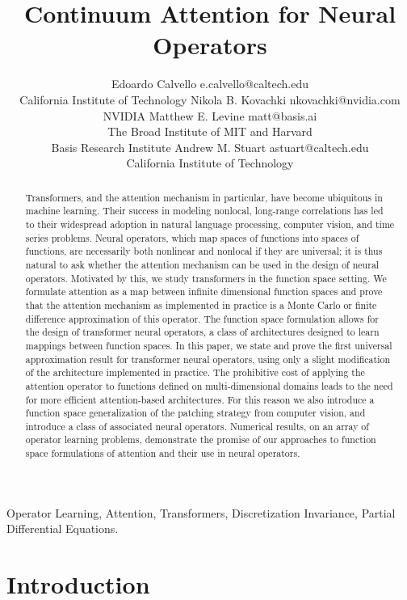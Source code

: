 \documentclass[twoside]{article}
\title{Continuum Attention for Neural Operators}
\author{\name Edoardo Calvello \email e.calvello@caltech.edu \\
       \addr 
       California Institute of Technology
       \AND
       \name Nikola B. Kovachki \email nkovachki@nvidia.com \\
       \addr NVIDIA
       \AND
       \name Matthew E. Levine \email matt@basis.ai \\
       \addr The Broad Institute of MIT and Harvard \\
       \addr Basis Research Institute
       \AND
       \name Andrew M. Stuart \email astuart@caltech.edu \\
       \addr
       California Institute of Technology}
\newcommand{\1}{\mathbbm{1}}
\newcommand{\nk}[1]{{\color{darkgreen}{#1}}}
\newcommand{\as}[1]{{\color{darkred}{#1}}}
\newcommand{\ec}[1]{{\color{blue}{#1}}}
\newcommand{\ml}[1]{{\color{cyan}{#1}}}
\begin{document}

\maketitle

\begin{abstract}
    Transformers, and the attention mechanism in particular, have become ubiquitous in machine learning. Their success in modeling nonlocal, long-range correlations has led to their widespread adoption in natural language processing, computer vision, and time series problems. Neural operators, which map spaces of functions into spaces of functions, are necessarily both nonlinear and nonlocal if they are universal;
    it is thus natural to ask whether the attention mechanism can be used in the design of neural operators. Motivated by this, we study transformers in the function space setting. We formulate attention as a map between infinite dimensional function spaces and prove that the attention mechanism as implemented in practice is a Monte Carlo
    or finite difference approximation of this operator. The function space formulation allows for the design of transformer neural operators, a class of architectures designed to learn mappings between function spaces. In this paper, we state and prove the first universal approximation result for transformer neural operators, using only a slight modification of the architecture implemented in practice. The prohibitive cost of applying the attention operator to functions defined on multi-dimensional domains leads to the need for more efficient attention-based architectures. For this reason we also introduce a function space generalization of the patching strategy from computer vision, and introduce a class of associated neural operators. Numerical results,
    on an array of operator learning problems, demonstrate the promise of our approaches to function space formulations of attention and their use in neural operators.
\end{abstract}


\begin{keywords}
  Operator Learning, Attention, Transformers, Discretization Invariance, Partial Differential Equations.
\end{keywords}

\section{Introduction}
\label{sec:intro}
\end{document}
